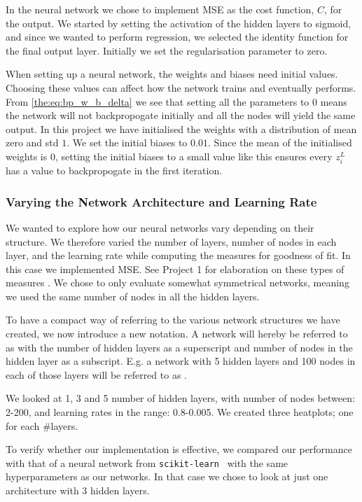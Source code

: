         In the neural network we chose to implement MSE as the cost function, $C$, for the output. We started by setting the activation of the hidden layers to sigmoid, and since we wanted to perform regression, we selected the identity function for the final output layer. Initially we set the regularisation parameter to zero. 

        When setting up a neural network, the weights and biases need initial values. Choosing these values can affect how the network trains and eventually performs. From \cref{the:eq:bp_w_b_delta} we see that setting all the parameters to $0$ means the network will not backpropogate initially and all the nodes will yield the same output. In this project we have initialised the weights with a distribution of mean zero and std $1$. We set the initial biases to $0.01$. Since the mean of the initialised weights is 0, setting the initial biases to a small value like this ensures every $z_i^L$ has a value to backpropogate in the first iteration.  
    
    \subsubsection{Varying the Network Architecture and Learning Rate}
        We wanted to explore how our neural networks vary depending on their structure. We therefore varied the number of layers, number of nodes in each layer, and the learning rate while computing the measures for goodness of fit. In this case we implemented MSE. See Project 1 for elaboration on these types of measures \citep{Project1}.
        We chose to only evaluate somewhat symmetrical networks, meaning we used the same number of nodes in all the hidden layers.

        To have a compact way of referring to the various network structures we have created, we now introduce a new notation. A network will hereby be referred to as  with the number of hidden layers as a superscript and number of nodes in the hidden layer as a subscript. E.g. a network with 5 hidden layers and 100 nodes in each of those layers will be referred to as .  

        We looked at 1, 3 and 5 number of hidden layers, with number of nodes between: 2-200, and learning rates in the range: 0.8-0.005. We created three heatplots; one for each \#layers. 

        To verify whether our implementation is effective, we compared our performance with that of a neural network from \verb|scikit-learn|~\citep{scikit-learn} with the same hyperparameters as our networks. In that case we chose to look at just one architecture with 3 hidden layers. 

